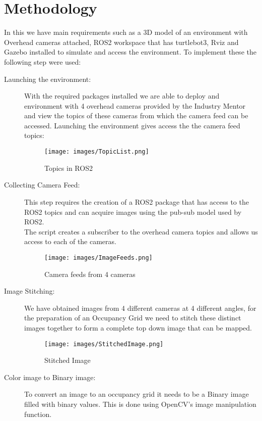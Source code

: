 \documentclass{josis}
\begin{document}
\section{Methodology}
    In this we have main requirements such as a 3D model of an environment with Overhead cameras attached, ROS2 workspace that has turtlebot3, Rviz and Gazebo installed to simulate and access the environment.
    To implement these the following step were used:
\begin{description}
    \item[Launching the environment:] With the required packages installed we are able to deploy and environment with 4 overhead cameras provided by the Industry Mentor and view the topics of these cameras from which the camera feed can be accessed. Launching the environment gives access the the camera feed topics:
    \begin{figure}
        \centering
        \texttt{[image: images/TopicList.png]}
        \caption{Topics in ROS2}
        \label{fig:enter-label}
    \end{figure}
    \pagebreak
    \item[Collecting Camera Feed:] This step requires the creation of a ROS2 package that has access to the ROS2 topics and can acquire images using the pub-sub model used by ROS2.\\
    The script creates a subscriber to the overhead camera topics and allows us access to each of the cameras.
    \begin{figure}[h]
        \centering
        \texttt{[image: images/ImageFeeds.png]}
        \caption{Camera feeds from 4 cameras}
        \label{fig:enter-label}
    \end{figure}

    \item[Image Stitching:] We have obtained images from 4 different cameras at 4 different angles, for the preparation of an Occupancy Grid we need to stitch these distinct images together to form a complete top down image that can be mapped. 
    \begin{figure}[h]
        \centering
        \texttt{[image: images/StitchedImage.png]}
        \caption{Stitched Image}
        \label{fig:enter-label}
    \end{figure}
    \pagebreak
    \item[Color image to Binary image:]To convert an image to an occupancy grid it needs to be a Binary image filled with binary values. This is done using OpenCV's image manipulation function.
    

\end{description}
\end{document}
